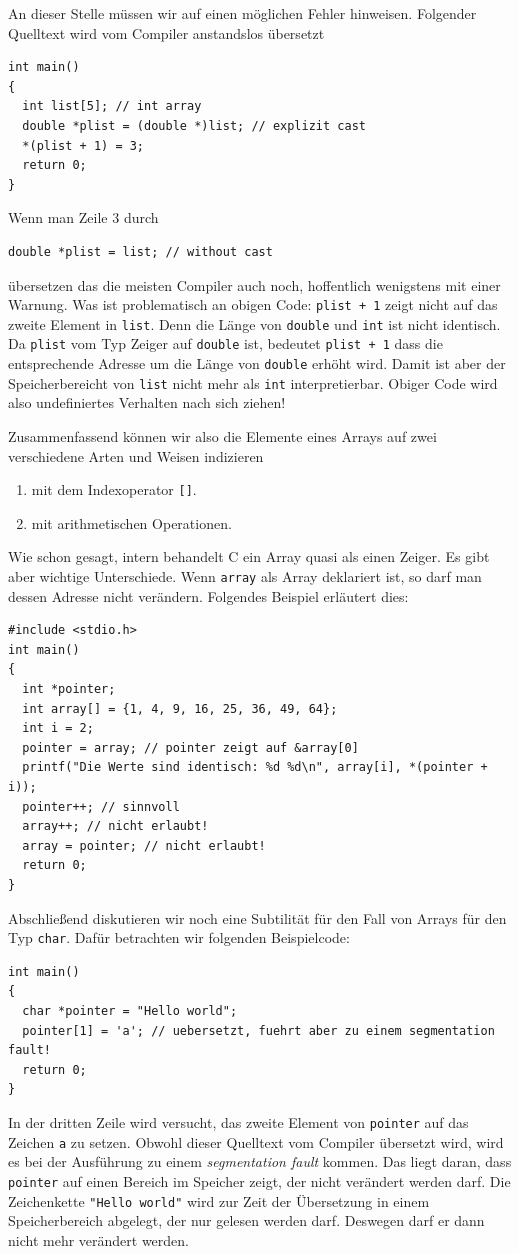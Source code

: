 An dieser Stelle müssen wir auf einen möglichen Fehler hinweisen.
Folgender Quelltext wird vom Compiler anstandslos übersetzt
\begin{lstlisting}
int main()
{
  int list[5]; // int array
  double *plist = (double *)list; // explizit cast
  *(plist + 1) = 3;
  return 0;
}
\end{lstlisting}
Wenn man Zeile $3$ durch
\begin{lstlisting}
double *plist = list; // without cast
\end{lstlisting}
übersetzen das die meisten Compiler auch noch, hoffentlich wenigstens mit einer Warnung.
Was ist problematisch an obigen Code:
\verb|plist + 1| zeigt nicht auf das zweite Element in \verb|list|.
Denn die Länge von \verb|double| und \verb|int| ist nicht identisch.
Da \verb|plist| vom Typ Zeiger auf \verb|double| ist, bedeutet \verb|plist + 1| dass die entsprechende Adresse um die Länge von \verb|double| erhöht wird.
Damit ist aber der Speicherbereicht von \verb|list| nicht mehr als \verb|int| interpretierbar.
Obiger Code wird also undefiniertes Verhalten nach sich ziehen!

Zusammenfassend können wir also die Elemente eines Arrays auf zwei verschiedene Arten und Weisen indizieren
\begin{enumerate}
\item mit dem Indexoperator \verb|[]|.
\item mit arithmetischen Operationen.
\end{enumerate}
Wie schon gesagt, intern behandelt C ein Array quasi als einen Zeiger.
Es gibt aber wichtige Unterschiede.
Wenn \verb|array| als Array deklariert ist, so darf man dessen Adresse nicht verändern.
Folgendes Beispiel erläutert dies:
\begin{lstlisting}
#include <stdio.h>
int main()
{
  int *pointer;
  int array[] = {1, 4, 9, 16, 25, 36, 49, 64};
  int i = 2;
  pointer = array; // pointer zeigt auf &array[0]
  printf("Die Werte sind identisch: %d %d\n", array[i], *(pointer + i));
  pointer++; // sinnvoll
  array++; // nicht erlaubt!
  array = pointer; // nicht erlaubt!
  return 0;
}
\end{lstlisting}
Abschließend diskutieren wir noch eine Subtilität für den Fall von Arrays für den Typ \verb|char|.
Dafür betrachten wir folgenden Beispielcode:
\begin{lstlisting}
int main()
{
  char *pointer = "Hello world";
  pointer[1] = 'a'; // uebersetzt, fuehrt aber zu einem segmentation fault!
  return 0;
}
\end{lstlisting}
In der dritten Zeile wird versucht, das zweite Element von \verb|pointer| auf das Zeichen \verb|a| zu setzen.
Obwohl dieser Quelltext vom Compiler übersetzt wird, wird es bei der Ausführung zu einem \emph{segmentation fault} kommen.
Das liegt daran, dass \verb|pointer| auf einen Bereich im Speicher zeigt, der nicht verändert werden darf.
Die Zeichenkette \verb|"Hello world"| wird zur Zeit der Übersetzung in einem Speicherbereich abgelegt, der nur gelesen werden darf.
Deswegen darf er dann nicht mehr verändert werden.

\endinput
